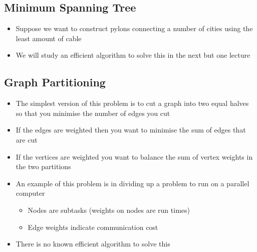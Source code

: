 
\begin{slide}
\section[-2]{Minimum Spanning Tree}
\pausebuild
\color{TwoColor}
\begin{itemize}
\item Suppose we want to construct pylons connecting a
  number of cities using the least amount of cable\pauseh
  \vspace*{-1cm}
  \begin{center}\color{TextColor}
    \pause
  \end{center}
  \vspace*{-1cm}
\color{TwoColor}
\item We will study an efficient algorithm to solve this in the next
  but one lecture\pauseh
\end{itemize}

\end{slide}


\begin{slide}
\section[-2]{Graph Partitioning}

\begin{PauseHighLight}
  \begin{itemize}\squeeze
  \item The simplest version of this problem is to cut a graph into two
    equal halves so that you minimise the number of edges you cut\pause
  \item If the edges are weighted then you want to minimise the sum of
    edges that are cut\pause
  \item If the vertices are weighted you want to balance the sum of
    vertex weights in the two partitions\pause
  \item An example of this problem is in dividing up a problem to run on
    a parallel computer\pause
    \begin{itemize}
    \item Nodes are subtasks (weights on nodes are run times)\pause
    \item Edge weights indicate communication cost\pause
    \end{itemize}
  \item There is no known efficient algorithm to solve this\pause
  \end{itemize}
\end{PauseHighLight}

\end{slide}

